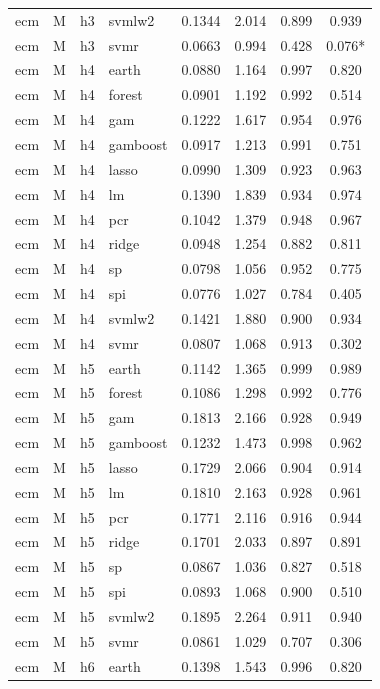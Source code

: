 \begin{ThreePartTable}
\begin{longtable}[t]{llclcccc}
ecm & M & h3 & svmlw2 & 0.1344 & 2.014 & 0.899 & 0.939\\
ecm & M & h3 & svmr & 0.0663 & 0.994 & 0.428 & 0.076*\\
\addlinespace
ecm & M & h4 & earth & 0.0880 & 1.164 & 0.997 & 0.820\\
ecm & M & h4 & forest & 0.0901 & 1.192 & 0.992 & 0.514\\
ecm & M & h4 & gam & 0.1222 & 1.617 & 0.954 & 0.976\\
ecm & M & h4 & gamboost & 0.0917 & 1.213 & 0.991 & 0.751\\
ecm & M & h4 & lasso & 0.0990 & 1.309 & 0.923 & 0.963\\
ecm & M & h4 & lm & 0.1390 & 1.839 & 0.934 & 0.974\\
ecm & M & h4 & pcr & 0.1042 & 1.379 & 0.948 & 0.967\\
ecm & M & h4 & ridge & 0.0948 & 1.254 & 0.882 & 0.811\\
ecm & M & h4 & sp & 0.0798 & 1.056 & 0.952 & 0.775\\
ecm & M & h4 & spi & 0.0776 & 1.027 & 0.784 & 0.405\\
ecm & M & h4 & svmlw2 & 0.1421 & 1.880 & 0.900 & 0.934\\
ecm & M & h4 & svmr & 0.0807 & 1.068 & 0.913 & 0.302\\
\addlinespace
ecm & M & h5 & earth & 0.1142 & 1.365 & 0.999 & 0.989\\
ecm & M & h5 & forest & 0.1086 & 1.298 & 0.992 & 0.776\\
ecm & M & h5 & gam & 0.1813 & 2.166 & 0.928 & 0.949\\
ecm & M & h5 & gamboost & 0.1232 & 1.473 & 0.998 & 0.962\\
ecm & M & h5 & lasso & 0.1729 & 2.066 & 0.904 & 0.914\\
ecm & M & h5 & lm & 0.1810 & 2.163 & 0.928 & 0.961\\
ecm & M & h5 & pcr & 0.1771 & 2.116 & 0.916 & 0.944\\
ecm & M & h5 & ridge & 0.1701 & 2.033 & 0.897 & 0.891\\
ecm & M & h5 & sp & 0.0867 & 1.036 & 0.827 & 0.518\\
ecm & M & h5 & spi & 0.0893 & 1.068 & 0.900 & 0.510\\
ecm & M & h5 & svmlw2 & 0.1895 & 2.264 & 0.911 & 0.940\\
ecm & M & h5 & svmr & 0.0861 & 1.029 & 0.707 & 0.306\\
\addlinespace
ecm & M & h6 & earth & 0.1398 & 1.543 & 0.996 & 0.820\\

\end{longtable}
\end{ThreePartTable}
